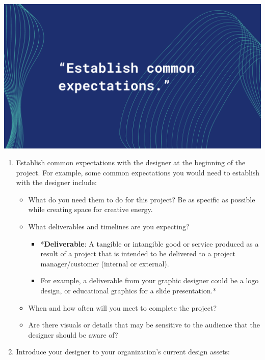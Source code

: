 \documentclass[
]{book}
\providecommand{\tightlist}{%
  \setlength{\itemsep}{0pt}\setlength{\parskip}{0pt}}
\begin{document}
\includegraphics{images/Working-With-Graphic-Designers-Quote-1.png}

\begin{enumerate}
\def\labelenumi{\arabic{enumi}.}
\tightlist
\item
  Establish common expectations with the designer at the beginning of the project. For example, some common expectations you would need to establish with the designer include:

  \begin{itemize}
  \tightlist
  \item
    What do you need them to do for this project? Be as specific as possible while creating space for creative energy.
  \item
    What deliverables and timelines are you expecting?

    \begin{itemize}
    \tightlist
    \item
      *\textbf{Deliverable}: A tangible or intangible good or service produced as a result of a project that is intended to be delivered to a project manager/customer (internal or external).
    \item
      For example, a deliverable from your graphic designer could be a logo design, or educational graphics for a slide presentation.*
    \end{itemize}
  \item
    When and how often will you meet to complete the project?
  \item
    Are there visuals or details that may be sensitive to the audience that the designer should be aware of?
  \end{itemize}
\item
  Introduce your designer to your organization's current design assets:


\end{enumerate}
\end{document}

